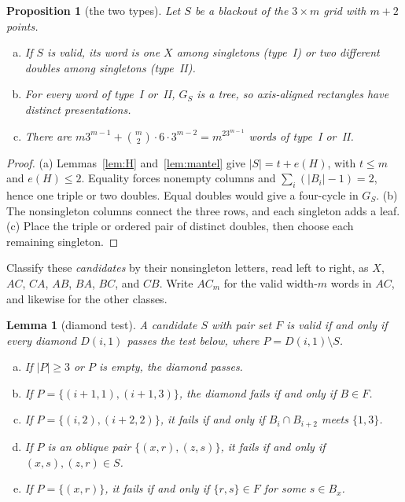\documentclass[12pt]{article}
\theoremstyle{plain}
\newtheorem{lemma}[theorem]{Lemma}
\newtheorem{proposition}[theorem]{Proposition}
\theoremstyle{definition}
\theoremstyle{remark}
\begin{document}
\begin{proposition}[the two types]\label{prop:threeclass}
Let $S$ be a blackout of the $3\times m$ grid with $m+2$ points.
\begin{enumerate}[(a)]
\item If $S$ is valid, its word is one $X$ among singletons (type~I) or two different doubles
among singletons (type~II).
\item For every word of type~I or~II, $G_S$ is a tree, so axis-aligned rectangles have
distinct presentations.
\item There are $m3^{m-1}+\binom m2\cdot6\cdot3^{m-2}=m^23^{m-1}$ words of type~I or~II.
\end{enumerate}
\end{proposition}

\begin{proof}
(a) Lemmas~\ref{lem:H} and~\ref{lem:mantel} give $|S|=t+e(H)$,
with $t\le m$ and $e(H)\le2$. Equality forces nonempty columns and
$\sum_i(|B_i|-1)=2$, hence one triple or two doubles.
Equal doubles would give a four-cycle in $G_S$.
(b) The nonsingleton columns connect the three rows, and each
singleton adds a leaf. (c) Place the triple or ordered pair of distinct
doubles, then choose each remaining singleton.
\end{proof}

Classify these \emph{candidates} by their nonsingleton letters, read left
to right, as $X$, $AC$, $CA$, $AB$, $BA$, $BC$, and $CB$.
Write $AC_m$ for the valid width-$m$ words in $AC$, and likewise for the other classes.

\begin{lemma}[diamond test]\label{lem:diamond}
A candidate $S$ with pair set $F$ is valid if and only if every diamond $D(i,1)$ passes the
test below, where $P=D(i,1)\setminus S$.
\begin{enumerate}[(a)]
\item If $|P|\ge3$ or $P$ is empty, the diamond passes.
\item If $P=\{(i+1,1),(i+1,3)\}$, the diamond fails if and only if $B\in F$.
\item If $P=\{(i,2),(i+2,2)\}$, it fails if and only if $B_i\cap B_{i+2}$ meets $\{1,3\}$.
\item If $P$ is an oblique pair $\{(x,r),(z,s)\}$, it fails if and only if $(x,s),(z,r)\in S$.
\item If $P=\{(x,r)\}$, it fails if and only if $\{r,s\}\in F$ for some $s\in B_x$.
\end{enumerate}
\end{lemma}
\end{document}
